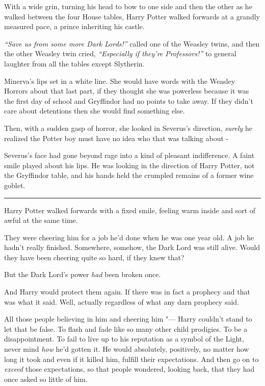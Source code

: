 With a wide grin, turning his head to bow to one side and then the other
as he walked between the four House tables, Harry Potter walked forwards
at a grandly measured pace, a prince inheriting his castle.

\emph{``Save us from some more Dark Lords!''} called one of the Weasley
twins, and then the other Weasley twin cried, \emph{``Especially if
they're Professors!''} to general laughter from all the tables except
Slytherin.

Minerva's lips set in a white line. She would have words with the
Weasley Horrors about that last part, if they thought she was powerless
because it was the first day of school and Gryffindor had no points to
take away. If they didn't care about detentions then she would find
something else.

Then, with a sudden gasp of horror, she looked in Severus's direction,
\emph{surely} he realized the Potter boy must have no idea who that was
talking about -

Severus's face had gone beyond rage into a kind of pleasant
indifference. A faint smile played about his lips. He was looking in the
direction of Harry Potter, not the Gryffindor table, and his hands held
the crumpled remains of a former wine goblet.

\begin{center}\rule{3in}{0.4pt}\end{center}

Harry Potter walked forwards with a fixed smile, feeling warm inside and
sort of awful at the same time.

They were cheering him for a job he'd done when he was one year old. A
job he hadn't really finished. Somewhere, somehow, the Dark Lord was
still alive. Would they have been cheering quite so hard, if they knew
that?

But the Dark Lord's power \emph{had} been broken once.

And Harry would protect them again. If there was in fact a prophecy and
that was what it said. Well, actually regardless of what any darn
prophecy said.

All those people believing in him and cheering him "--- Harry couldn't
stand to let that be false. To flash and fade like so many other child
prodigies. To be a disappointment. To fail to live up to his reputation
as a symbol of the Light, never mind \emph{how} he'd gotten it. He would
absolutely, positively, no matter how long it took and even if it killed
him, fulfill their expectations. And then go on to \emph{exceed} those
expectations, so that people wondered, looking back, that they had once
asked so little of him.

